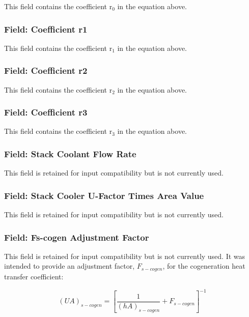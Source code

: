 This field contains the coefficient r\(_{0}\) in the equation above.

\subsubsection{Field: Coefficient r1}\label{field-coefficient-r1}

This field contains the coefficient r\(_{1}\) in the equation above.

\subsubsection{Field: Coefficient r2}\label{field-coefficient-r2}

This field contains the coefficient r\(_{2}\) in the equation above.

\subsubsection{Field: Coefficient r3}\label{field-coefficient-r3}

This field contains the coefficient r\(_{3}\) in the equation above.

\subsubsection{Field: Stack Coolant Flow Rate}\label{field-stack-coolant-flow-rate}

This field is retained for input compatibility but is not currently used.

\subsubsection{Field: Stack Cooler U-Factor Times Area Value}\label{field-stack-cooler-u-factor-times-area-value}

This field is retained for input compatibility but is not currently used.

\subsubsection{Field: Fs-cogen Adjustment Factor}\label{field-fs-cogen-adjustment-factor}

This field is retained for input compatibility but is not currently used. It was intended to provide an adjustment factor, \({F_{s - cogen}}\), for the cogeneration heat transfer coefficient:

\begin{equation}
{\left( {UA} \right)_{s - cogen}} = {\left[ {\frac{1}{{{{\left( {hA} \right)}_{s - cogen}}}} + {F_{s - cogen}}} \right]^{ - 1}}
\end{equation}

